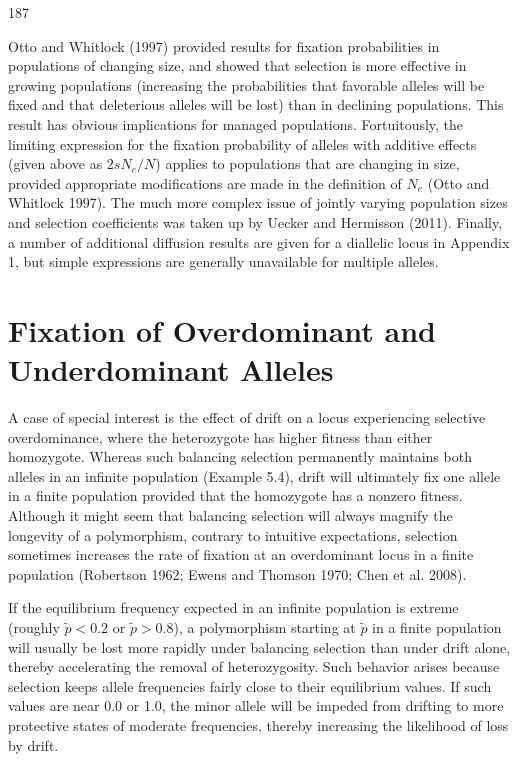 \documentclass{article}
\begin{document}
187

Otto and Whitlock (1997) provided results for fixation probabilities in populations of changing size, and showed that selection is more effective in growing populations (increasing the probabilities that favorable alleles will be fixed and that deleterious alleles will be lost) than in declining populations. This result has obvious implications for managed populations. Fortuitously, the limiting expression for the fixation probability of alleles with additive effects (given above as  $ 2sN_e/N $) applies to populations that are changing in size, provided appropriate modifications are made in the definition of  $ N_e $ (Otto and Whitlock 1997). The much more complex issue of jointly varying population sizes and selection coefficients was taken up by Uecker and Hermisson (2011). Finally, a number of additional diffusion results are given for a diallelic locus in Appendix 1, but simple expressions are generally unavailable for multiple alleles.

\section{Fixation of Overdominant and Underdominant Alleles}
A case of special interest is the effect of drift on a locus experiencing selective overdominance, where the heterozygote has higher fitness than either homozygote. Whereas such balancing selection permanently maintains both alleles in an infinite population (Example 5.4), drift will ultimately fix one allele in a finite population provided that the homozygote has a nonzero fitness. Although it might seem that balancing selection will always magnify the longevity of a polymorphism, contrary to intuitive expectations, selection sometimes increases the rate of fixation at an overdominant locus in a finite population (Robertson 1962; Ewens and Thomson 1970; Chen et al. 2008).

If the equilibrium frequency expected in an infinite population is extreme (roughly  $ \widetilde{p} < 0.2 $ or  $ \widetilde{p} > 0.8 $), a polymorphism starting at  $ \widetilde{p} $ in a finite population will usually be lost more rapidly under balancing selection than under drift alone, thereby accelerating the removal of heterozygosity. Such behavior arises because selection keeps allele frequencies fairly close to their equilibrium values. If such values are near 0.0 or 1.0, the minor allele will be impeded from drifting to more protective states of moderate frequencies, thereby increasing the likelihood of loss by drift.
\end{document}
